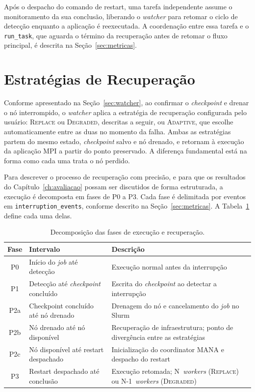 Após o despacho do comando de restart, uma tarefa independente assume o monitoramento
da sua conclusão, liberando o \textit{watcher} para retomar o ciclo de detecção enquanto a
aplicação é reexecutada. A coordenação entre essa tarefa e o \texttt{run\_task}, que
aguarda o término da recuperação antes de retomar o fluxo principal, é descrita na
Seção~\ref{sec:metricas}.

\section{Estratégias de Recuperação}
\label{sec:estrategias}

Conforme apresentado na Seção~\ref{sec:watcher}, ao confirmar o \textit{checkpoint} e drenar
o nó interrompido, o \textit{watcher} aplica a estratégia de recuperação configurada
pelo usuário: \textsc{Replace} ou \textsc{Degraded}, descritas a seguir, ou
\textsc{Adaptive}, que escolhe automaticamente entre as duas no momento da falha.
Ambas as estratégias partem do mesmo estado,
\textit{checkpoint} salvo e nó drenado, e retornam à execução da aplicação \gls{MPI} a partir
do ponto preservado. A diferença fundamental está na forma como cada uma trata o nó
perdido.

Para descrever o processo de recuperação com precisão, e para que os resultados do
Capítulo~\ref{ch:avaliacao} possam ser discutidos de forma estruturada, a execução é
decomposta em fases de P0 a P3. Cada fase é delimitada por eventos em
\texttt{interruption\_events}, conforme descrito na Seção~\ref{sec:metricas}. A
Tabela~\ref{tab:fases-recuperacao} define cada uma delas.

\begin{table}[htb]
  \caption{Decomposição das fases de execução e recuperação.}
  \label{tab:fases-recuperacao}
  \begin{tabular}{c l p{6.8cm}}
    \toprule
    Fase & Intervalo & Descrição \\
    \midrule
    P0 & Início do \textit{job} até detecção & Execução normal antes da interrupção \\
    P1 & Detecção até \textit{checkpoint} concluído & Escrita do \textit{checkpoint} ao detectar a interrupção \\
    P2a & Checkpoint concluído até nó drenado & Drenagem do nó e cancelamento do \textit{job} no Slurm \\
    P2b & Nó drenado até nó disponível & Recuperação de infraestrutura; ponto de divergência entre as estratégias \\
    P2c & Nó disponível até restart despachado & Inicialização do coordinator MANA e despacho do restart \\
    P3 & Restart despachado até conclusão & Execução retomada; N~\textit{workers} (\textsc{Replace}) ou N{-}1~\textit{workers} (\textsc{Degraded}) \\
    \bottomrule
  \end{tabular}
\end{table}

